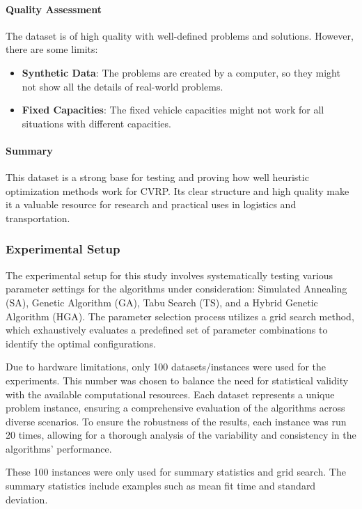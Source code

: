 \documentclass[
]{article}
\begin{document}
    \paragraph{Quality Assessment}
    The dataset is of high quality with well-defined problems and solutions. However, there are some limits:
    \begin{itemize}
        \item \textbf{Synthetic Data}: The problems are created by a computer, so they might not show all the details of real-world problems.
        \item \textbf{Fixed Capacities}: The fixed vehicle capacities might not work for all situations with different capacities.
    \end{itemize}

    \paragraph{Summary}
    This dataset is a strong base for testing and proving how well heuristic optimization methods work for CVRP. Its clear structure and high quality make it a valuable resource for research and practical uses in logistics and transportation.

    \subsubsection{Experimental Setup}

    The experimental setup for this study involves systematically testing various parameter settings for the algorithms under consideration: Simulated Annealing (SA), Genetic Algorithm (GA), Tabu Search (TS), and a Hybrid Genetic Algorithm (HGA). The parameter selection process utilizes a grid search method, which exhaustively evaluates a predefined set of parameter combinations to identify the optimal configurations.

    Due to hardware limitations, only 100 datasets/instances were used for the experiments. This number was chosen to balance the need for statistical validity with the available computational resources. Each dataset represents a unique problem instance, ensuring a comprehensive evaluation of the algorithms across diverse scenarios. To ensure the robustness of the results, each instance was run 20 times, allowing for a thorough analysis of the variability and consistency in the algorithms’ performance.

    These 100 instances were only used for summary statistics and grid search. The summary statistics include examples such as mean fit time and standard deviation.
\end{document}
